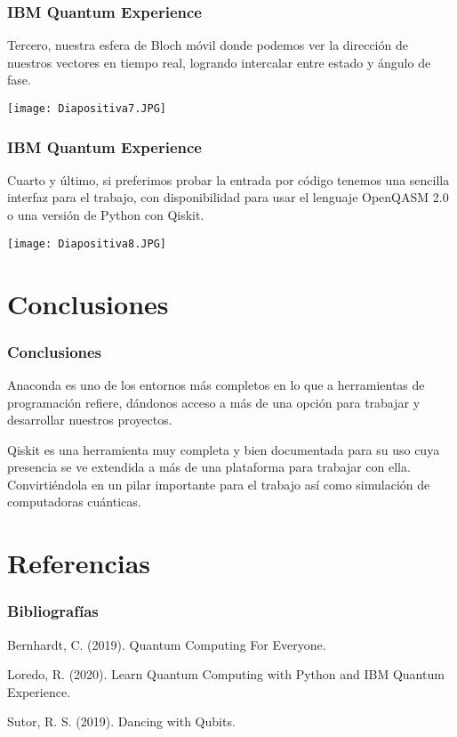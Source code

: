 \documentclass[spanish]{beamer}
\begin{document}
  \newpage\justify \begin{frame}
 \frametitle{IBM Quantum Experience} 
 Tercero, nuestra esfera de Bloch móvil donde podemos ver la dirección de nuestros vectores en tiempo real, logrando intercalar entre estado y ángulo de fase.
 
 \centering\texttt{[image: Diapositiva7.JPG]}
 \end{frame}
 
 \newpage\justify \begin{frame}
 \frametitle{IBM Quantum Experience} 
Cuarto y último, si preferimos probar la entrada por código tenemos una sencilla interfaz para el trabajo, con disponibilidad para usar el lenguaje OpenQASM 2.0 o una versión de Python con Qiskit.
 
\centering\texttt{[image: Diapositiva8.JPG]}
\end{frame}
\section{Conclusiones}\setlength{\parskip}{1mm}
\begin{frame}[fragile]\frametitle{Conclusiones}\justify 

Anaconda es uno de los entornos más completos en lo que a herramientas de programación refiere, dándonos acceso a más de una opción para trabajar y desarrollar nuestros proyectos. 

Qiskit es una herramienta muy completa y bien documentada para su uso cuya presencia se ve extendida a más de una plataforma para trabajar con ella. Convirtiéndola en un pilar importante para el trabajo así como simulación de computadoras cuánticas.

\end{frame}
\section{Referencias}\setlength{\parskip}{1mm}
\begin{frame}[fragile]\frametitle{Bibliografías}\justify 
Bernhardt, C. (2019). Quantum Computing For Everyone. 

Loredo, R. (2020). Learn Quantum Computing with Python and IBM Quantum Experience. 

Sutor, R. S. (2019). Dancing with Qubits. 

\end{frame}
\end{document}
